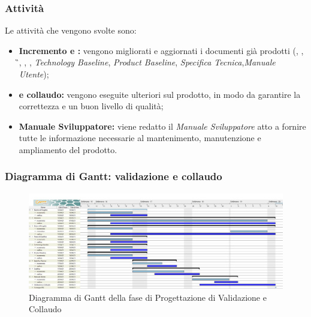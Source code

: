 \subsubsection{Attività}
Le attività che vengono svolte sono:
\begin{itemize}
	\item \textbf{Incremento e :} vengono migliorati e aggiornati i documenti già prodotti (\NdP{}, \PdP{}, \G{}, \PdQ{}, \AdR{}, \textit{Technology Baseline}, \textit{Product Baseline}, \textit{Specifica Tecnica},\textit{Manuale Utente});
	\item \textbf{ e collaudo:} vengono eseguite ulteriori  sul prodotto, in modo da garantire la correttezza e un buon livello di qualità;
	\item \textbf{Manuale Sviluppatore:} viene redatto il \textit{Manuale Sviluppatore} atto a fornire tutte le informazione necessarie al mantenimento, manutenzione e ampliamento del prodotto.
\end{itemize}
\subsubsection{Diagramma di Gantt: validazione e collaudo}
\begin{figure}[H]
    \centering
    \includegraphics[scale = 0.25]{components/img/validazione_collaudo.jpg}
    \caption{Diagramma di Gantt della fase di Progettazione di Validazione e Collaudo}
    \label{fig:\glo{Diagramma di Gantt}, fase di \glo{Validazione} e collaudo}
\end{figure}
